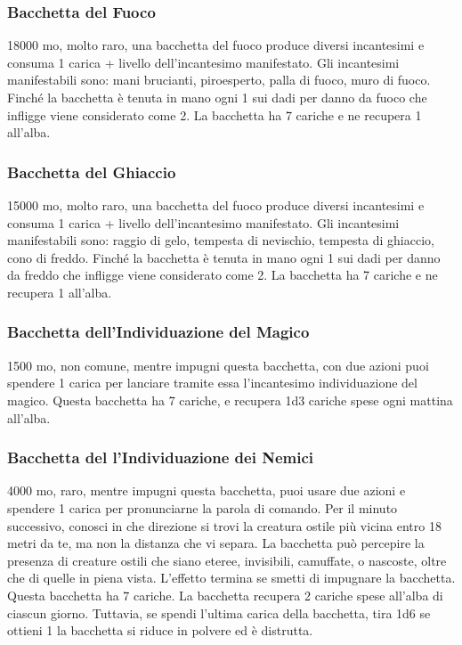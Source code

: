 \begin{multicols}{2}
	\subsubsection*{Bacchetta del Fuoco}
	18000 mo, molto raro, una bacchetta del fuoco produce diversi incantesimi e consuma 1 carica + livello dell'incantesimo manifestato. Gli incantesimi manifestabili sono: mani brucianti, piroesperto, palla di fuoco, muro di fuoco. Finché la bacchetta è tenuta in mano ogni 1 sui dadi per danno da fuoco che infligge viene considerato come 2. La bacchetta ha 7 cariche e ne recupera 1 all'alba.

	\subsubsection*{Bacchetta del Ghiaccio}
	15000 mo, molto raro, una bacchetta del fuoco produce diversi incantesimi e consuma 1 carica + livello dell'incantesimo manifestato. Gli incantesimi manifestabili sono: raggio di gelo, tempesta di nevischio, tempesta di ghiaccio, cono di freddo. Finché la bacchetta è tenuta in mano ogni 1 sui dadi per danno da freddo che infligge viene considerato come 2. La bacchetta ha 7 cariche e ne recupera 1 all'alba.

	\subsubsection*{Bacchetta dell'Individuazione del Magico}
	1500 mo, non comune, mentre impugni questa bacchetta, con due azioni puoi spendere 1 carica per lanciare tramite essa l'incantesimo individuazione del magico. Questa bacchetta ha 7 cariche, e recupera 1d3 cariche spese ogni mattina all'alba.

	\subsubsection*{Bacchetta del l'Individuazione dei Nemici}
	4000 mo, raro, mentre impugni questa bacchetta, puoi usare due azioni e spendere 1 carica per pronunciarne la parola di comando. Per il minuto successivo, conosci in che direzione si trovi la creatura ostile più vicina entro 18 metri da te, ma non la distanza che vi separa. La bacchetta può percepire la presenza di creature ostili che siano eteree, invisibili, camuffate, o nascoste, oltre che di quelle in piena vista. L'effetto termina se smetti di impugnare la bacchetta. Questa bacchetta ha 7 cariche. La bacchetta recupera 2 cariche spese all'alba di ciascun giorno. Tuttavia, se spendi l'ultima carica della bacchetta, tira 1d6 se ottieni 1 la bacchetta si riduce in polvere ed è distrutta.


\end{multicols}
